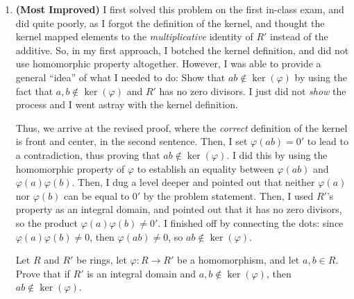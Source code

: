 \begin{enumerate}[label=\textbf{\arabic*.}]
    \item \textbf{(Most Improved)} I first solved this problem on the first in-class exam, and did quite poorly, as I forgot the definition of the kernel, and thought the kernel mapped elements to the \textit{multiplicative} identity of \(R'\) instead of the additive. So, in my first approach, I botched the kernel definition, and did not use homomorphic property altogether. However, I was able to provide a general ``idea'' of what I needed to do: Show that \(ab \notin \ker(\varphi)\) by using the fact that \(a,b \notin \ker(\varphi)\) and \(R'\) has no zero divisors. I just did not \textit{show} the process and I went astray with the kernel definition. 

    Thus, we arrive at the revised proof, where the \textit{correct} definition of the kernel is front and center, in the second sentence. Then, I set \(\varphi(ab) = 0'\) to lead to a contradiction, thus proving that \(ab \notin \ker(\varphi)\). I did this by using the homomorphic property of \(\varphi\) to establish an equality between \(\varphi(ab)\) and \(\varphi(a)\varphi(b)\). Then, I dug a level deeper and pointed out that neither \(\varphi(a)\) nor \(\varphi(b)\) can be equal to \(0'\) by the problem statement. Then, I used \(R'\)'s property as an integral domain, and pointed out that it has no zero divisors, so the product \(\varphi(a)\varphi(b) \ne 0'\). I finished off by connecting the dots: since \(\varphi(a)\varphi(b) \ne 0\), then \(\varphi(ab) \ne 0\), so \(ab \notin \ker(\varphi)\). 

    \begin{problem}
        Let \(R\) and \(R'\) be rings, let \(\varphi : R \to R'\) be a homomorphism, and let \(a,b \in R\). Prove that if \(R'\) is an integral domain and \(a,b \notin \ker(\varphi)\), then \(ab \notin \ker(\varphi)\). 
    \end{problem}
    \newpage


\end{enumerate}
